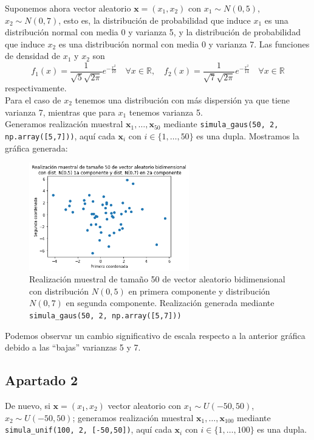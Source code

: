\documentclass[11pt,a4paper]{article}
\theoremstyle{definition}
\newcommand{\R}{\mathbb{R}}
\begin{document}
	Suponemos ahora vector aleatorio $\mathbf{x}=(x_1,x_2)$ con $x_1 \sim N(0,5)$, $x_2 \sim N(0,7)$, esto es, la distribución de probabilidad que induce $x_1$ es una distribución normal con media 0 y varianza 5, y la distribución de probabilidad que induce $x_2$ es una distribución normal con media 0 y varianza 7. Las funciones de densidad de $x_1$ y $x_2$ son
	$$f_1(x)= \frac{1}{\sqrt{5}\sqrt{2\pi}}e^{-\frac{x^2}{10}}\quad \forall x \in \R, \quad f_2(x)= \frac{1}{\sqrt{7}\sqrt{2\pi}}e^{-\frac{x^2}{14}} \quad \forall x \in \R$$ respectivamente.\\
	Para el caso de $x_2$ tenemos una distribución con más dispersión ya que tiene varianza 7, mientras que para $x_1$ tenemos varianza 5.\\
	 Generamos realización muestral $\mathbf{x}_1,\ldots, \mathbf{x}_{50}$ mediante \texttt{simula\_gaus(50, 2, np.array([5,7]))}, aquí cada $\mathbf{x}_i$ con $i\in \{1,\ldots,50\}$ es una dupla. Mostramos la gráfica generada:
	\begin{figure}[H]
		\centering
		\includegraphics[width=0.62\textwidth]{images/dist_50_gaussiana}
		\caption{Realización muestral de tamaño 50 de vector aleatorio bidimensional con distribución $N(0,5)$ en primera componente y distribución $N(0,7)$ en segunda componente. Realización generada mediante \texttt{simula\_gaus(50, 2, np.array([5,7]))}}
	\end{figure}
	Podemos observar un cambio significativo de escala respecto a la anterior gráfica debido a las ``bajas'' varianzas 5 y 7.
	\subsection{Apartado 2}
	De nuevo, si $\mathbf{x}=(x_1,x_2)$ vector aleatorio con $x_1 \sim U(-50,50)$, $x_2 \sim U(-50,50)$; generamos realización muestral $\mathbf{x}_1,\ldots, \mathbf{x}_{100}$ mediante \texttt{simula\_unif(100, 2, [-50,50])}, aquí cada $\mathbf{x}_i$ con $i\in \{1,\ldots,100\}$ es una dupla.
	
\end{document}
